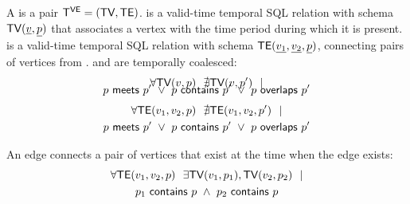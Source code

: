 \begin{definition}[TGraph]
A \tg is a pair $\mathsf{T^{VE}}=(\textsf{TV}, \textsf{TE})$. \tv is a valid-time temporal SQL
relation with schema $\textsf{TV}(\underline{v}, \underline{p})$ that
associates a vertex with the time period during which it is
present. \te is a valid-time temporal SQL relation with schema
$\textsf{TE}(\underline{v_1}, \underline{v_2}, \underline{p})$, connecting
pairs of vertices from \tv.  \tv and \te are temporally coalesced:
\vspace{-0.3cm}
\begin{multline}
\vspace{-0.3cm}
\forall \tv(v, p)~~\nexists \tv(v, p')~~| \\
                       \pred{p}{meets}{p'}~\lor~\pred{p}{contains}{p'}~\lor~\pred{p}{overlaps}{p'}
\label{def:tg:c2}
\end{multline}
\vspace{-0.7cm}
\begin{multline}
\forall \textsf{TE}(v_1, v_2, p)~~\nexists \textsf{TE}(v_1,v_2, p')~~| \\
                       p~\mathsf{meets}~p'~\lor~p~\mathsf{contains}~p'~\lor~p~\mathsf{overlaps}~p'
\label{def:tg:c3}
\end{multline}

An edge connects a pair of vertices that exist at the time when the edge exists:
\vspace{-0.3cm}
\begin{multline}
\forall \textsf{TE}(v_1, v_2, p)~~\exists \textsf{TV}(v_1, p_1), \textsf{TV}(v_2, p_2)~~| \\
                       p_1~\mathsf{contains}~p~\wedge~p_2~\mathsf{contains}~p
\label{def:tg:c1}
\end{multline}
\vspace{-0.5cm}


\end{definition}
